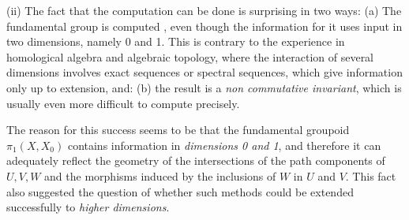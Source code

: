 \documentclass[12pt]{article}
\theoremstyle{definition}
\theoremstyle{remark}
\numberwithin{equation}{subsection}
\begin{document}
\noindent (ii) The fact that the computation can be done is surprising in two ways:
 (a) The fundamental group is computed {\emprecisely}, even though the information for 
it uses input in two dimensions, namely $0$ and 1. This is contrary to the experience in
homological algebra and algebraic topology, where the interaction
of several dimensions involves exact sequences or spectral
sequences, which give information only up to extension,  and: 
  (b) the result is a \emph{non commutative invariant}, which is usually even more difficult to %
compute precisely.


The reason for this success seems to be that the fundamental groupoid $\pi_1(X,X_0)$ contains 
information in \emph{dimensions 0 and 1}, and therefore it can adequately reflect the geometry 
of the intersections of the path components of $U,V,W$ and the morphisms induced by the 
inclusions of $W$ in $U$ and $V$. This fact also suggested the question of whether such 
methods could be extended successfully to \emph{higher dimensions}.
\end{document}
